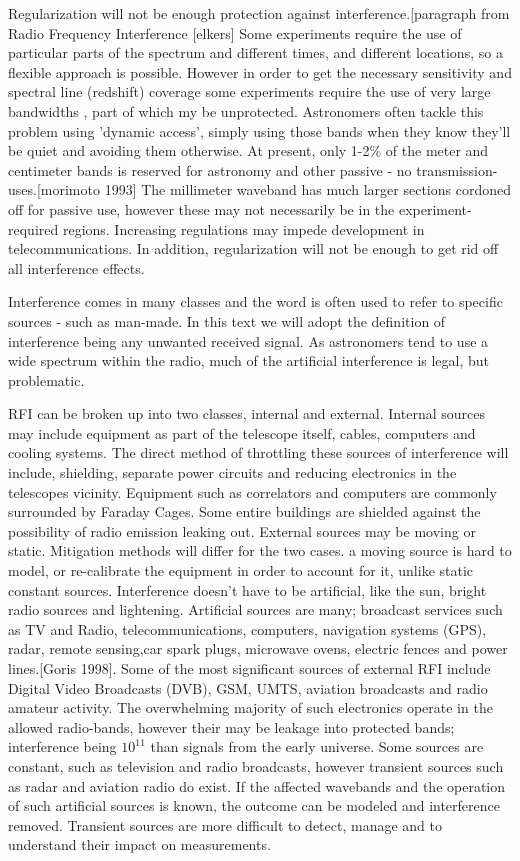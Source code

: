 Regularization will not be enough protection against interference.[paragraph from Radio Frequency Interference [elkers]
Some experiments require the use of particular parts of the spectrum and different times, and different locations, so a flexible approach is possible.
However in order to get the necessary sensitivity and spectral line (redshift) coverage some experiments require the use of very large bandwidths , part of which my be unprotected\citep{fridman2001rfi}.
Astronomers often tackle this problem using 'dynamic access', simply using those bands when they know they'll be quiet and avoiding them otherwise\citep{fridman2001rfi}.
At present, only 1-2\% of the meter and centimeter bands is reserved for astronomy and other passive - no transmission- uses.[morimoto 1993]
The millimeter waveband has much larger sections cordoned off for passive use, however these may not necessarily be in the experiment-required regions.
Increasing regulations may impede development in telecommunications.
In addition, regularization will not be enough to get rid off all interference  effects.

Interference comes in many classes and the word is often used to refer to specific sources - such as man-made.
In this text we will adopt the definition of interference being any unwanted received signal.
As astronomers tend to use a wide spectrum within the radio, much of the artificial interference is legal, but problematic.

RFI can be broken up into two classes, internal and external.
Internal sources may include equipment as part of the telescope itself, cables, computers and cooling systems.
The direct method of throttling these sources of interference will include, shielding, separate power circuits and reducing electronics in the telescopes vicinity.
Equipment such as correlators and computers are commonly surrounded by Faraday Cages.
Some entire buildings are shielded against the possibility of radio emission leaking out.\citep{van2009radio}
External sources may be moving or static.
Mitigation methods will differ for the two cases.
a moving source is hard to model, or re-calibrate the equipment in order to account for it, unlike static constant sources.
Interference doesn't have to be artificial, like the sun, bright radio sources and lightening.
Artificial sources are many; broadcast services such as TV and Radio, telecommunications, computers, navigation systems (GPS), radar, remote sensing,car spark plugs, microwave ovens, electric fences and power lines.[Goris 1998]\citep{ekers2000radio}.
Some of the most significant sources of external RFI  include Digital Video Broadcasts (DVB), GSM, UMTS, aviation broadcasts and radio amateur activity.
The overwhelming majority of such electronics operate in the allowed radio-bands, however their may be leakage into protected bands; interference being $10^{11}$ than signals from the early universe.
Some sources are constant, such as television and radio broadcasts, however transient sources such as radar and aviation radio do exist.
If the affected wavebands and the operation of such artificial sources is known, the outcome can be modeled and interference removed.
Transient sources are more difficult to detect, manage and to understand their impact on measurements.

